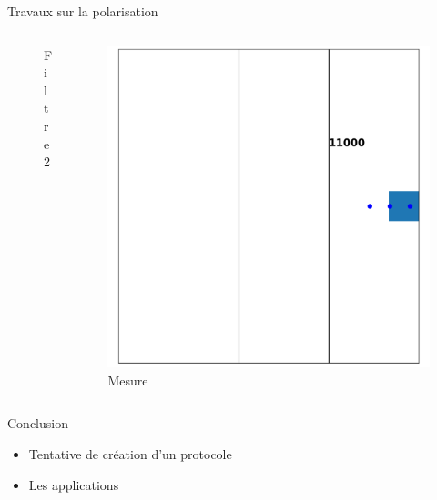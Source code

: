 \documentclass[french]{beamer}
\begin{document}
\begin{frame}{Travaux sur la polarisation}
\begin{columns}
\begin{column}{0.5\textwidth}
\begin{figure}
                \caption{\small Filtre 2}
            \end{figure}
        \end{column}
        \begin{column}{0.5\textwidth}
            \begin{figure}
                \captionsetup{labelformat=empty}
                \includegraphics[scale=0.05]{Fin.png}
                \caption{\small Mesure}
            \end{figure}
        \end{column}
    \end{columns}
\end{frame}

\begin{frame}{Conclusion}
    \begin{itemize}
        \item Tentative de création d'un protocole
        \item Les applications
    \end{itemize}
\end{frame}
\end{document}

